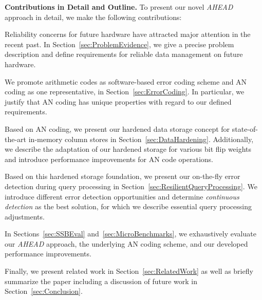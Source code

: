 \textbf{Contributions in Detail and Outline.}
To present our novel \emph{AHEAD} approach in detail, we make the following contributions:  
\begin{compactenum}
	\item Reliability concerns for future hardware have attracted major attention in the recent past. In Section~\ref{sec:ProblemEvidence}, we give a precise problem description and define requirements for reliable data management on future hardware.
	\item We promote arithmetic codes as software-based error coding scheme and AN coding as one representative, in Section~\ref{sec:ErrorCoding}. In particular, we justify that AN coding has unique properties with regard to our defined requirements. 	
	\item Based on AN coding, we present our hardened data storage concept for state-of-the-art in-memory column stores in Section~\ref{sec:DataHardening}. Additionally, we describe the adaptation of our hardened storage for various bit flip weights and introduce performance improvements for AN code operations.
	\item Based on this hardened storage foundation, we present our on-the-fly error detection during query processing in Section~\ref{sec:ResilientQueryProcessing}. We introduce different error detection opportunities and determine \emph{continuous detection} as the best solution, for which we describe essential query processing adjustments. 
	\item In Sections~\ref{sec:SSBEval} and~\ref{sec:MicroBenchmarks}, we exhaustively evaluate our \emph{AHEAD} approach, the underlying AN coding scheme, and our developed performance improvements. 
\end{compactenum}
Finally, we present related work in Section~\ref{sec:RelatedWork} as well as briefly summarize the paper including a discussion of future work in Section~\ref{sec:Conclusion}.

